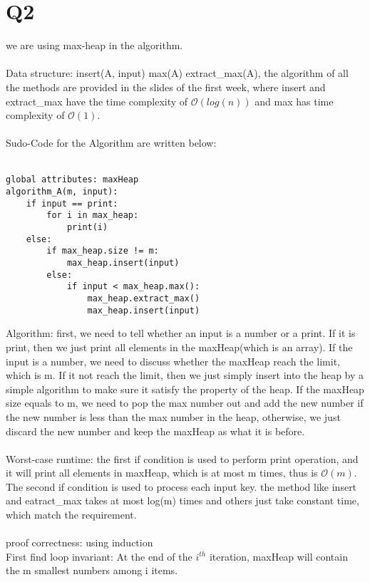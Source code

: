 \documentclass[11pt]{article}
\begin{document}
\section*{Q2}
we are using max-heap in the algorithm.\\
\\
Data structure: insert(A, input) max(A) extract\_max(A), the algorithm of all the methods are provided in the slides of the first week, where insert and extract\_max have the time complexity of $\mathcal{O}(log(n))$ and max has time complexity of $\mathcal{O}(1)$.\\
\\
Sudo-Code for the Algorithm are written below:\\
\\
\begin{lstlisting}[frame=single]
global attributes: maxHeap
algorithm_A(m, input):
	if input == print:
		for i in max_heap:
			print(i)
	else:
		if max_heap.size != m:
			max_heap.insert(input)
		else:
			if input < max_heap.max():
				max_heap.extract_max()
				max_heap.insert(input)
\end{lstlisting}
Algorithm: first, we need to tell whether an input is a number or a print. If it is print, then we just print all elements in the maxHeap(which is an array). If the input is a number, we need to discuss whether the maxHeap reach the limit, which is m. If it not reach the limit, then we just simply insert into the heap by a simple algorithm to make sure it satisfy the property of the heap. If the maxHeap size equals to m, we need to pop the max number out and add the new number if the new number is less than the max number in the heap, otherwise, we just discard the new number and keep the maxHeap as what it is before.\\
\\
Worst-case runtime: the first if condition is used to perform print operation, and it will print all elements in maxHeap, which is at most m times, thus is $\mathcal{O}(m)$. The second if condition is used to process each input key. the method like insert and eatract\_max takes at most log(m) times and others just take constant time, which match the requirement.\\
\\
proof correctness: using induction\\
First find loop invariant: At the end of the $i^{th}$ iteration, maxHeap will contain the m smallest numbers among i items.
\end{document}
